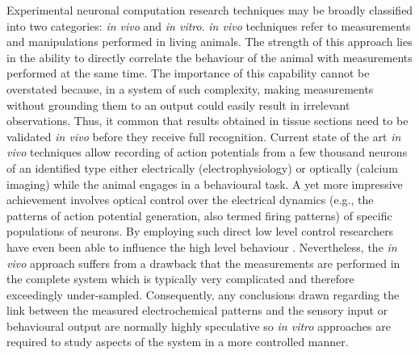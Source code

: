     Experimental neuronal computation research techniques may be broadly classified into two categories: \textit{in vivo} and \textit{in vitro}. \textit{in vivo} techniques refer to measurements and manipulations performed in living animals. The strength of this approach lies in the ability to directly correlate the behaviour of the animal with measurements performed at the same time. The importance of this capability cannot be overstated because, in a system of such complexity, making measurements without grounding them to an output could easily result in irrelevant observations. Thus, it common that results obtained in tissue sections need to be validated \textit{in vivo} before they receive full recognition. Current state of the art \textit{in vivo} techniques allow recording of action potentials from a few thousand  neurons of an identified type either electrically (electrophysiology) \cite{berenyi2014large} or optically (calcium imaging) \cite{emiliani2015all} while the animal engages in a behavioural task. A yet more impressive achievement involves optical control over the electrical dynamics (e.g., the patterns of action potential generation, also termed firing patterns) of specific populations of neurons. By employing such direct low level control researchers have even been able to influence the high level behaviour \cite{emiliani2015all}. Nevertheless, the \textit{in vivo} approach suffers from a drawback that the measurements are performed in the complete system which is typically very complicated and therefore exceedingly under-sampled. Consequently, any conclusions drawn regarding the link between the measured electrochemical patterns and the sensory input or behavioural output are normally highly speculative so \textit{in vitro} approaches are required to study aspects of the system in a more controlled manner.

